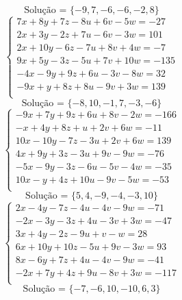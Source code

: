 \documentclass[12pt,oneside,a4paper]{article}
\begin{document}
\begin{equation*}
\text{Solução = }\{-9,7,-6,-6,-2,8\}
\end{equation*}
\vspace{\baselineskip}
\begin{equation*}
\begin{cases}
7x+8y+7z-8u+6v-5w=-27 \\
2x+3y-2z+7u-6v-3w=101 \\
2x+10y-6z-7u+8v+4w=-7 \\
9x+5y-3z-5u+7v+10w=-135 \\
-4x-9y+9z+6u-3v-8w=32 \\
-9x+y+8z+8u-9v+3w=139 \\
\end{cases}
\end{equation*}
\begin{equation*}
\text{Solução = }\{-8,10,-1,7,-3,-6\}
\end{equation*}
\vspace{\baselineskip}
\begin{equation*}
\begin{cases}
-9x+7y+9z+6u+8v-2w=-166 \\
-x+4y+8z+u+2v+6w=-11 \\
10x-10y-7z-3u+2v+6w=139 \\
4x+9y+3z-3u+9v-9w=-76 \\
-5x-9y-3z-6u-5v-4w=-35 \\
10x-y+4z+10u-9v-5w=-53 \\
\end{cases}
\end{equation*}
\begin{equation*}
\text{Solução = }\{5,4,-9,-4,-3,10\}
\end{equation*}
\vspace{\baselineskip}
\begin{equation*}
\begin{cases}
2x-4y-7z-4u-4v-9w=-71 \\
-2x-3y-3z+4u-3v+3w=-47 \\
3x+4y-2z-9u+v-w=28 \\
6x+10y+10z-5u+9v-3w=93 \\
8x-6y+7z+4u-4v-9w=-41 \\
-2x+7y+4z+9u-8v+3w=-117 \\
\end{cases}
\end{equation*}
\begin{equation*}
\text{Solução = }\{-7,-6,10,-10,6,3\}
\end{equation*}
\end{document}

